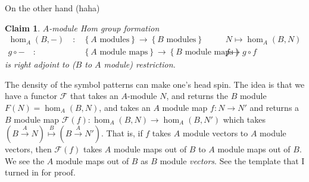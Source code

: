 \documentclass[18pt]{amsart}
\newtheorem{claim}{Claim}
\newcommand{\Res}{\operatorname{Res}}
\begin{document}
On the other hand (haha)
	\begin{claim}
		$A$-module Hom group formation
			\begin{align*}
			 \hom_A(B, -)  \quad :& \left \{ A \text{ modules} \right \} \to \left \{ B \text{ modules} \right \} 				 & N \mapsto \hom_A(B,N)\\
			 g \circ -  \quad :& \left \{ A \text{ module maps} \right \} \to \left \{ B \text{ module maps} \right \}		                  & f \mapsto   g\circ f
			\end{align*}
		is right adjoint to ($B$ to $A$ module) restriction.
	\end{claim}
The density of the symbol patterns can make one's head spin. The idea is that we have  a functor $\mathcal{F}$ that takes an $A$-module $N$, and returns the $B$ module $F(N)=\hom_A (B,N)$, and takes an $A$ module map $f:N\to N'$ and returns a $B$ module map $\mathcal{F}(f): \hom_A(B,N)\to\hom_A(B,N')$ which takes $(B \stackrel{A}{\to} N) \stackrel{B}{\mapsto} (B \stackrel{A}{\to}N')$. That is, if $f$ takes $A$ module vectors to $A$ module vectors, then $\mathcal{F}(f)$ takes $A$ module maps out of $B$ to $A$ module maps out of $B$. We see the $A$ module maps out of $B$ as $B$ module \emph{vectors}. See the template that I turned in for proof.
\end{document}
